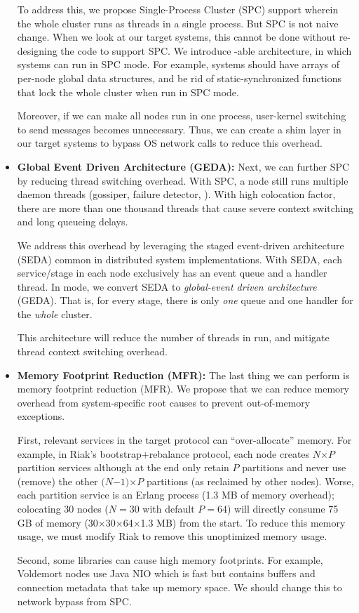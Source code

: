 \begin{itemize}
To address this, we propose Single-Process Cluster (SPC) support wherein the
whole cluster runs as threads in a single process. But SPC is not naive change.
When we look at our target systems, this cannot be done without re-designing the
code to support SPC. We introduce \sck-able architecture, in which systems can
run in SPC mode. For example, systems should have arrays of per-node global data
structures, and be rid of static-synchronized functions that lock the whole
cluster when run in SPC mode.

Moreover, if we can make all nodes run in one process, user-kernel switching to
send messages becomes unnecessary. Thus, we can create a shim layer in our
target systems to bypass OS network calls to reduce this overhead.


\item {\bf Global Event Driven Architecture (GEDA):} Next, we can further SPC by
reducing thread switching overhead. With SPC, a node still runs multiple daemon
threads (gossiper, failure detector, \etc). With high colocation factor, there
are more than one thousand threads that cause severe context switching and long
queueing delays.

We address this overhead by leveraging the staged event-driven architecture
(SEDA) \cite{Welsh+01-Seda} common in distributed system implementations.  With
SEDA, each service/stage in each node exclusively has an event queue and a
handler thread. In \sck mode, we convert SEDA to {\em global-event driven
architecture} (GEDA). That is, for every stage, there is only {\em one} queue
and one handler for the {\em whole} cluster.

This architecture will reduce the number of threads in \sck run, and mitigate
thread context switching overhead.

\item {\bf Memory Footprint Reduction (MFR):} The last thing we can perform is
memory footprint reduction (MFR). We propose that we can reduce memory overhead
from system-specific root causes to prevent out-of-memory exceptions.

First, relevant services in the target protocol can ``over-allocate'' memory.
%
For example, in Riak's bootstrap+rebalance protocol, each node creates
$N$$\times$$P$ partition services although at the end only retain $P$ partitions
and never use (remove) the other $(N$$-$$1)$$\times$$P$ partitions (as reclaimed
by other nodes).
%
Worse, each partition service is an Erlang process (1.3 MB of memory overhead);
colocating 30 nodes ($N$$=$30 with default $P$$=$64) will directly consume 75 GB
of memory (30$\times$30$\times$64$\times$1.3 MB) from the start.
%
To reduce this memory usage, we must modify Riak to remove this unoptimized
memory usage.

Second, some libraries can cause high memory footprints. For example, Voldemort
nodes use Java NIO \cite{VoldemortNIO} which is fast but contains buffers and
connection metadata that take up memory space. We should change this to
network bypass from SPC.



\end{itemize}

